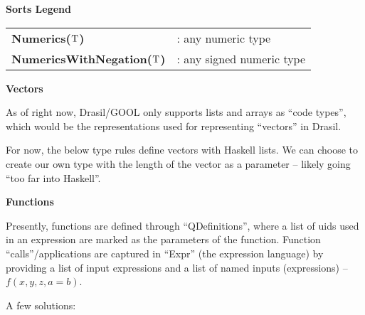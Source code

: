 \begin{center}
    \textbf{Sorts Legend}
    \begin{tabular}{ l l }
        \textbf{Numerics($\mathrm{T}$)} &: any numeric type \\
        \textbf{NumericsWithNegation($\mathrm{T}$)} &: any signed numeric type
    \end{tabular}
    
\end{center}

\textbf{Vectors}

As of right now, Drasil/GOOL only supports lists and arrays as ``code types'', 
which would be the representations used for representing ``vectors'' in Drasil.


For now, the below type rules define vectors with Haskell lists. We can choose to
create our own type with the length of the vector as a parameter -- likely going
``too far into Haskell''.

\textbf{Functions}

Presently, functions are defined through ``QDefinitions'', where a list of
\acsp{uid} used in an expression are marked as the parameters of the function. Function
``calls''/applications are captured in ``Expr'' (the expression language) by
providing a list of input expressions and a list of named inputs (expressions) -- 
$f(x,y,z,a=b)$.



A few solutions:

